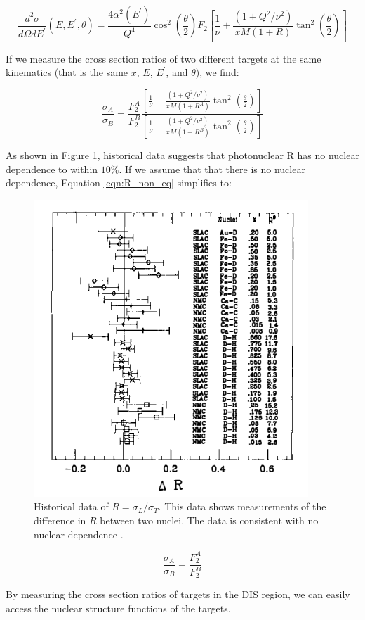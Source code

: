 \begin{equation}
	\frac{d^2\sigma}{d\Omega dE^\prime}\left(E,E^\prime,\theta\right) = \frac{4\alpha^2\left(E^\prime\right)}{Q^4}\cos^2\left(\frac{\theta}{2}\right)F_2\left[\frac{1}{\nu}+\frac{\left(1+Q^2/\nu^2\right)}{xM\left(1+R\right)}\tan^2\left(\frac{\theta}{2}\right)\right]
\end{equation}

If we measure the cross section ratios of two different targets at the same kinematics (that is the same $x$, $E$, $E^\prime$, and $\theta$), we find:

\begin{equation}
	\frac{\sigma_A}{\sigma_B} = \frac{F_2^A}{F_2^B} \frac{\left[\frac{1}{\nu}+\frac{\left(1+Q^2/\nu^2\right)}{xM\left(1+R^A\right)}\tan^2\left(\frac{\theta}{2}\right)\right]}{\left[\frac{1}{\nu}+\frac{\left(1+Q^2/\nu^2\right)}{xM\left(1+R^B\right)}\tan^2\left(\frac{\theta}{2}\right)\right]}
	\label{eqn:R_non_eq}
\end{equation}

As shown in Figure \ref{R_no_A}, historical data suggests that photonuclear R has no nuclear dependence to within $10\%$. If we assume that that there is no nuclear dependence, Equation \ref{eqn:R_non_eq} simplifies to:

\begin{figure}
\begin{center}
	\includegraphics{./scattering/fig/R_LT.png}
	\caption{Historical data of $R=\sigma_L/\sigma_T$. This data shows measurements of the difference in $R$ between two nuclei. The data is consistent with no nuclear dependence \cite{GST}.}
	\label{R_no_A}
\end{center}
\end{figure}

\begin{equation}
	\frac{\sigma_A}{\sigma_B} = \frac{F_2^A}{F_2^B}
\end{equation}

By measuring the cross section ratios of targets in the DIS region, we can easily access the nuclear structure functions of the targets.